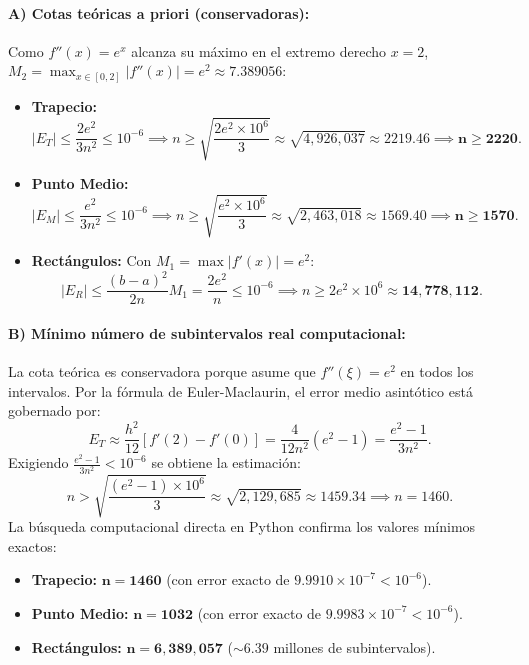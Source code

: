 \documentclass[11pt,a4paper]{article}
\begin{document}
\paragraph{A) Cotas teóricas a priori (conservadoras):}
Como $f''(x) = e^x$ alcanza su máximo en el extremo derecho $x=2$, $M_2 = \max_{x\in[0,2]} |f''(x)| = e^2 \approx 7.389056$:
\begin{itemize}
    \item \textbf{Trapecio:}
    \begin{equation}
        |E_T| \le \frac{2 e^2}{3 n^2} \le 10^{-6} \implies n \ge \sqrt{\frac{2 e^2 \times 10^6}{3}} \approx \sqrt{4{,}926{,}037} \approx 2219.46 \implies \mathbf{n \ge 2220}.
    \end{equation}
    \item \textbf{Punto Medio:}
    \begin{equation}
        |E_M| \le \frac{e^2}{3 n^2} \le 10^{-6} \implies n \ge \sqrt{\frac{e^2 \times 10^6}{3}} \approx \sqrt{2{,}463{,}018} \approx 1569.40 \implies \mathbf{n \ge 1570}.
    \end{equation}
    \item \textbf{Rectángulos:} Con $M_1 = \max |f'(x)| = e^2$:
    \begin{equation}
        |E_R| \le \frac{(b-a)^2}{2n} M_1 = \frac{2 e^2}{n} \le 10^{-6} \implies n \ge 2 e^2 \times 10^6 \approx \mathbf{14{,}778{,}112}.
    \end{equation}
\end{itemize}

\paragraph{B) Mínimo número de subintervalos real computacional:}
La cota teórica es conservadora porque asume que $f''(\xi) = e^2$ en todos los intervalos. Por la fórmula de Euler-Maclaurin, el error medio asintótico está gobernado por:
\begin{equation}
    E_T \approx \frac{h^2}{12} [f'(2) - f'(0)] = \frac{4}{12 n^2} (e^2 - 1) = \frac{e^2 - 1}{3 n^2}.
\end{equation}
Exigiendo $\frac{e^2 - 1}{3 n^2} < 10^{-6}$ se obtiene la estimación:
\begin{equation}
    n > \sqrt{\frac{(e^2 - 1) \times 10^6}{3}} \approx \sqrt{2{,}129{,}685} \approx 1459.34 \implies n = 1460.
\end{equation}
La búsqueda computacional directa en Python confirma los valores mínimos exactos:
\begin{itemize}
    \item \textbf{Trapecio:} $\mathbf{n = 1460}$ (con error exacto de $9.9910 \times 10^{-7} < 10^{-6}$).
    \item \textbf{Punto Medio:} $\mathbf{n = 1032}$ (con error exacto de $9.9983 \times 10^{-7} < 10^{-6}$).
    \item \textbf{Rectángulos:} $\mathbf{n = 6{,}389{,}057}$ ($\sim 6.39$ millones de subintervalos).
\end{itemize}
\end{document}
